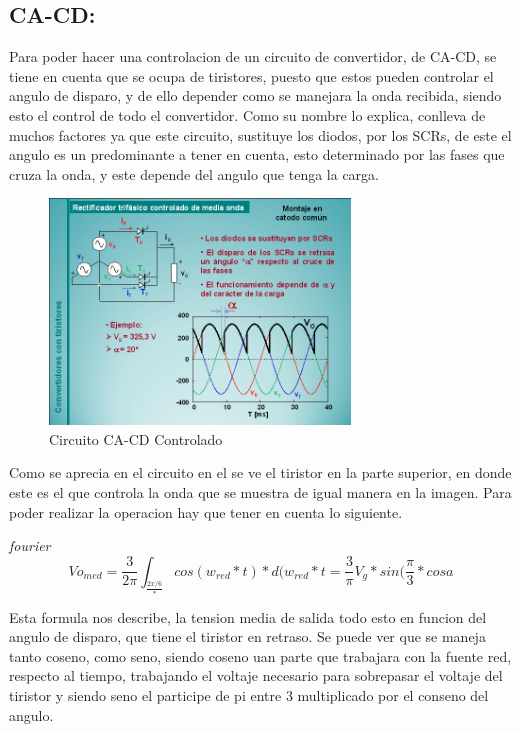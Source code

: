 \documentclass[12pt,a4paper]{article}
\begin{document}
\subsection{CA-CD:}

Para poder hacer una controlacion de un circuito de convertidor, de CA-CD, se tiene en cuenta que se ocupa de tiristores, puesto que estos pueden controlar el angulo de disparo, y de ello depender como se manejara la onda recibida, siendo esto el control de todo el convertidor.
Como su nombre lo explica, conlleva de muchos factores ya que este circuito, sustituye los diodos, por los SCRs, de este el angulo es un predominante a tener en cuenta, esto determinado por las fases que cruza la onda, y este depende del angulo que tenga la carga.\\

\begin{figure}[hbtp]
\caption{Circuito CA-CD Controlado}
\centering
\includegraphics[width=8cm]{img1.png}
\end{figure}

Como se aprecia en el circuito en el se ve el tiristor en la parte superior, en donde este es el que controla la onda que se muestra de igual manera en la imagen. Para poder realizar la operacion hay que tener en cuenta lo siguiente.

\emph{fourier}
$$ Vo_{med}= \frac{3}{2\pi} \int_\frac{2x/6}* cos(w_{red}* t)* d(w_{red}* t= \frac{3}{\pi}V_{g}* sin(\frac{\pi}{3}* cos a $$

Esta formula nos describe, la tension media de salida todo esto en funcion del angulo de disparo, que tiene el tiristor en retraso. Se puede ver que se maneja tanto coseno, como seno, siendo coseno uan parte que trabajara con la fuente red, respecto al tiempo, trabajando el voltaje necesario para sobrepasar el voltaje del tiristor y siendo seno el participe de pi entre 3 multiplicado por el conseno del angulo.\\
\end{document}
